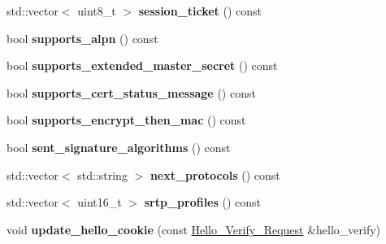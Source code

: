 \begin{DoxyCompactItemize}
std\+::vector$<$ uint8\+\_\+t $>$ {\bfseries session\+\_\+ticket} () const
\item 
\mbox{\label{class_botan_1_1_t_l_s_1_1_client___hello_a4ca07eaae1cd82b6df12460e0b8630f1}} 
bool {\bfseries supports\+\_\+alpn} () const
\item 
\mbox{\label{class_botan_1_1_t_l_s_1_1_client___hello_abc7528347bb52609aca8b3647283049c}} 
bool {\bfseries supports\+\_\+extended\+\_\+master\+\_\+secret} () const
\item 
\mbox{\label{class_botan_1_1_t_l_s_1_1_client___hello_a5979db068cee155cb7265c9192228f20}} 
bool {\bfseries supports\+\_\+cert\+\_\+status\+\_\+message} () const
\item 
\mbox{\label{class_botan_1_1_t_l_s_1_1_client___hello_ac80096d2ae6b8476d0c4ced2f301fe9f}} 
bool {\bfseries supports\+\_\+encrypt\+\_\+then\+\_\+mac} () const
\item 
\mbox{\label{class_botan_1_1_t_l_s_1_1_client___hello_a3cf910f1f672362e50fd4cda8c1bf9fc}} 
bool {\bfseries sent\+\_\+signature\+\_\+algorithms} () const
\item 
\mbox{\label{class_botan_1_1_t_l_s_1_1_client___hello_a0975b6a54022fa461a25f6eb9d8e6af0}} 
std\+::vector$<$ std\+::string $>$ {\bfseries next\+\_\+protocols} () const
\item 
\mbox{\label{class_botan_1_1_t_l_s_1_1_client___hello_ab4d8c827ef1a455ed30dfbf5bc9c65a8}} 
std\+::vector$<$ uint16\+\_\+t $>$ {\bfseries srtp\+\_\+profiles} () const
\item 
\mbox{\label{class_botan_1_1_t_l_s_1_1_client___hello_aa4ce0efb4da5c07822f714557a84c28a}} 
void {\bfseries update\+\_\+hello\+\_\+cookie} (const \hyperlink{class_botan_1_1_t_l_s_1_1_hello___verify___request}{Hello\+\_\+\+Verify\+\_\+\+Request} \&hello\+\_\+verify)
\item 
\mbox{\label{class_botan_1_1_t_l_s_1_1_client___hello_a9ff6a4f09fc7a26a63c3ce985cf51d03}} 

\end{DoxyCompactItemize}
